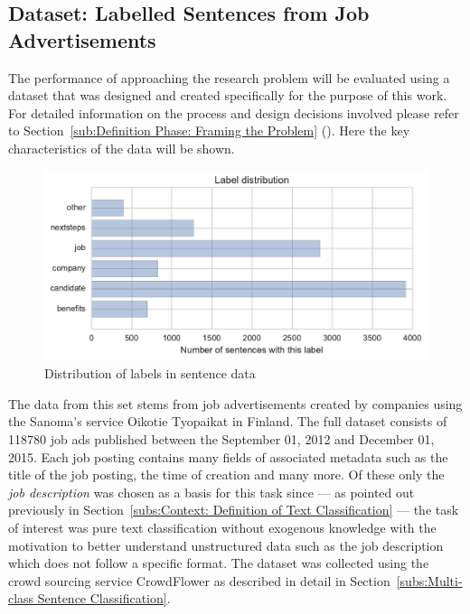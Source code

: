 \subsection{Dataset: Labelled Sentences from Job Advertisements}
\label{subs:Dataset: Labelled Sentences from Job Advertisements}

The performance of approaching the research problem will be evaluated using a dataset that was designed and created specifically for the purpose of this work. For detailed information on the process and design decisions involved please refer to Section~\ref{sub:Definition Phase: Framing the Problem} (). Here the key characteristics of the data will be shown.

\begin{figure}[h]
    \centering
    \includegraphics[width=\textwidth]{img/sentence-data-label-dist.pdf}
    \caption{Distribution of labels in sentence data}
\label{fig:sentence-data-label-dist}
\end{figure}

The data from this set stems from job advertisements created by companies using the \gls{Sanoma}'s service \gls{Oikotie Tyopaikat} in Finland. The full dataset consists of 118780 job ads published between the September 01, 2012 and December 01, 2015. Each job posting contains many fields of associated metadata such as the title of the job posting, the time of creation and many more. Of these only the \emph{job description} was chosen as a basis for this task since --- as pointed out previously in Section~\ref{subs:Context: Definition of Text Classification} --- the task of interest was pure text classification without exogenous knowledge with the motivation to better understand unstructured data such as the job description which does not follow a specific format. The dataset was collected using the \gls{crowd sourcing} service \gls{CrowdFlower} as described in detail in Section~\ref{subs:Multi-class Sentence Classification}.

